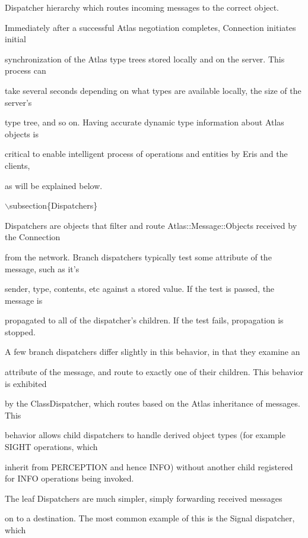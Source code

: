 \documentclass[12pt]{article}
\begin{document}
Dispatcher hierarchy which routes incoming messages to the correct object.



Immediately after a successful Atlas negotiation completes, Connection initiates initial

synchronization of the Atlas type trees stored locally and on the server. This process can

take several seconds depending on what types are available locally, the size of the server's

type tree, and so on. Having accurate dynamic type information about Atlas objects is

critical to enable intelligent process of operations and entities by Eris and the clients,

as will be explained below.  



\ensuremath{\backslash}subsection\{Dispatchers\}



Dispatchers are objects that filter and route Atlas::Message::Objects received by the Connection

from the network. Branch dispatchers typically test some attribute of the message, such as it's

sender, type, contents, etc against a stored value. If the test is passed, the message is

propagated to all of the dispatcher's children. If the test fails, propagation is stopped.



A few branch dispatchers differ slightly in this behavior, in that they examine an

attribute of the message, and route to exactly one of their children. This behavior is exhibited

by the ClassDispatcher, which routes based on the Atlas inheritance of messages. This

behavior allows child dispatchers to handle derived object types (for example SIGHT operations, which

inherit from PERCEPTION and hence INFO) without another child registered for INFO operations being invoked.



The leaf Dispatchers are much simpler, simply forwarding received messages

on to a destination. The most common example of this is the Signal dispatcher, which
\end{document}
